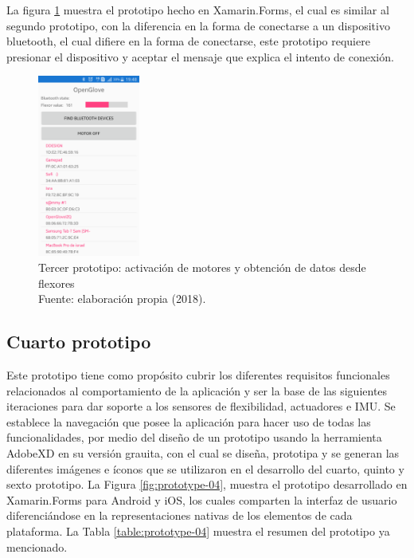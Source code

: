 La figura \ref{fig:prototype-03} muestra el prototipo hecho en Xamarin.Forms, el cual es similar al segundo prototipo, con la diferencia en la forma de conectarse a un dispositivo bluetooth, el cual difiere en la forma de conectarse, este prototipo requiere presionar el dispositivo y aceptar el mensaje que explica el intento de conexión.


\begin{figure}[H]
	\centering
	\captionsetup{justification=centering}
   	\includegraphics[width=0.3\textwidth]{images/chapter03/03-prototype.png} 
            \caption[Tercer prototipo: activación de motores y obtención de datos desde flexores]{Tercer prototipo: activación de motores y obtención de datos desde flexores \\ Fuente: elaboración propia (2018).}
    \label{fig:prototype-03}
\end{figure}





\subsection{Cuarto prototipo}
\label{cuarto-prototipo}
Este prototipo tiene como propósito cubrir los diferentes requisitos funcionales relacionados al comportamiento de la aplicación y ser la base de las siguientes iteraciones para dar soporte a los sensores de flexibilidad, actuadores e IMU. Se establece la navegación que posee la aplicación para hacer uso de todas las funcionalidades, por medio del diseño de un prototipo usando la herramienta AdobeXD en su versión grauita, con el cual se diseña, prototipa y se generan las diferentes imágenes e íconos que se utilizaron en el desarrollo del cuarto, quinto y sexto prototipo. La Figura \ref{fig:prototype-04}, muestra el prototipo desarrollado en Xamarin.Forms para Android y iOS, los cuales comparten la interfaz de usuario diferenciándose en la representaciones nativas de los elementos de cada plataforma. La Tabla \ref{table:prototype-04} muestra el resumen del prototipo ya mencionado.


